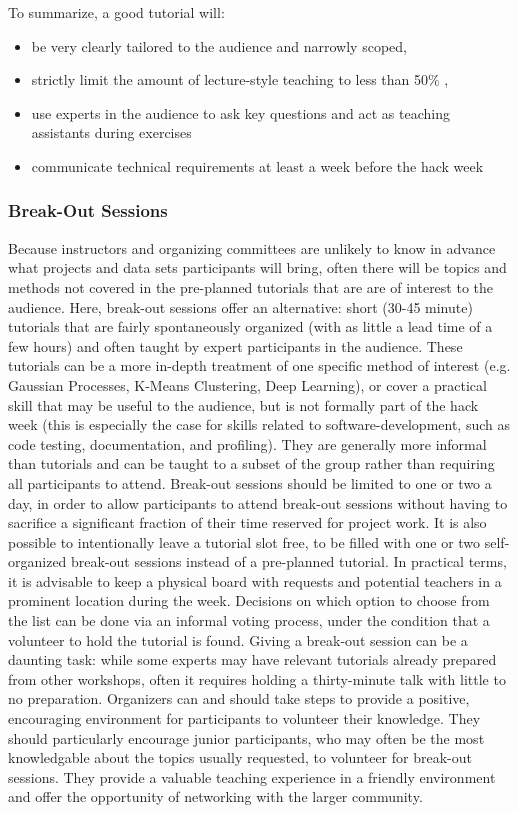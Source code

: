 \documentclass{nature}
\begin{document}
To summarize, a good tutorial will:
\begin{itemize}
\item be very clearly tailored to the audience and narrowly scoped,
\item strictly limit the amount of lecture-style teaching to less than 50\% ,
\item use experts in the audience to ask key questions and act as teaching assistants during exercises
\item communicate technical requirements at least a week before the hack week
\end{itemize}

\subsubsection{Break-Out Sessions}

Because instructors and organizing committees are unlikely to know in advance what projects and data sets participants will bring, often there will be topics and methods not covered in the pre-planned tutorials that are are of interest to the audience. Here, break-out sessions offer an alternative: short (30-45 minute) tutorials that are fairly spontaneously organized (with as little a lead time of a few hours) and often taught by expert participants in the audience. These tutorials can be a more in-depth treatment of one specific method of interest (e.g. Gaussian Processes, K-Means Clustering, Deep Learning), or cover a practical skill that may be useful to the audience, but is not formally part of the hack week (this is especially the case for skills related to software-development, such as code testing, documentation, and profiling). They are generally more informal than tutorials and can be taught to a subset of the group rather than requiring all participants to attend.
Break-out sessions should be limited to one or two a day, in order to allow participants to attend break-out sessions without having to sacrifice a significant fraction of their time reserved for project work. It is also possible to intentionally leave a tutorial slot free, to be filled with one or two self-organized break-out sessions instead of a pre-planned tutorial. In practical terms, it is advisable to keep a physical board with requests and potential teachers in a prominent location during the week. Decisions on which option to choose from the list can be done via an informal voting process, under the condition that a volunteer to hold the tutorial is found. Giving a break-out session can be a daunting task: while some experts may have relevant tutorials already prepared from other workshops, often it requires holding a thirty-minute talk with little to no preparation. Organizers can and should take steps to provide a positive, encouraging environment for participants to volunteer their knowledge. They should particularly encourage junior participants, who may often be the most knowledgable about the topics usually requested, to volunteer for break-out sessions. They provide a valuable teaching experience in a friendly environment and offer the opportunity of networking with the larger community.
\end{document}
